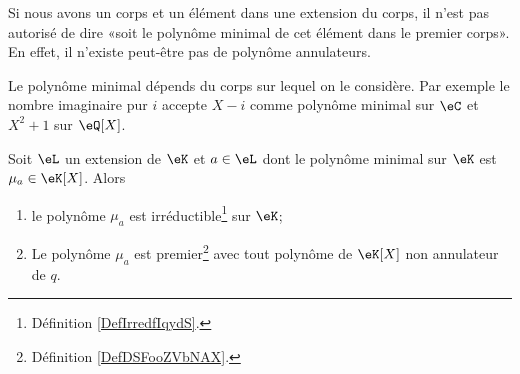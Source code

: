 Si nous avons un corps et un élément dans une extension du corps, il n'est pas autorisé de dire «soit le polynôme minimal de cet élément dans le premier corps». En effet, il n'existe peut-être pas de polynôme annulateurs.

\begin{example}
    Le polynôme minimal dépends du corps sur lequel on le considère. Par exemple le nombre imaginaire pur \( i\) accepte \( X-i\) comme polynôme minimal sur \( \eC\) et \( X^2+1\) sur \( \eQ[X]\).
\end{example}

\begin{proposition}  \label{PropRARooKavaIT}
    Soit \( \eL\) un extension de \( \eK\) et \( a\in \eL\) dont le polynôme minimal sur \( \eK\) est \( \mu_a\in\eK[X]\). Alors
    \begin{enumerate}
        \item   \label{ItemDOQooYpLvXri}
            le polynôme \( \mu_a\) est irréductible\footnote{Définition \ref{DefIrredfIqydS}.} sur \( \eK\);
        \item
            Le polynôme \( \mu_a\) est premier\footnote{Définition \ref{DefDSFooZVbNAX}.} avec tout polynôme de \( \eK[X]\) non annulateur de \( q\).
    \end{enumerate}
\end{proposition}


